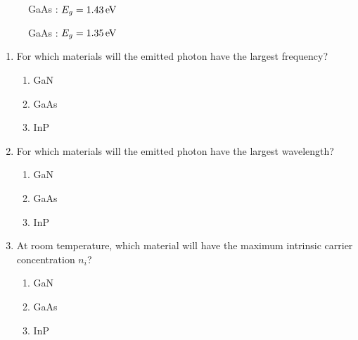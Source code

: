 \documentclass[fleqn, a4paper, 11pt, oneside]{amsart}
\theoremstyle{definition}
\theoremstyle{theorem}
\begin{document}
\begin{question}
\begin{figure}[H]
		\caption{GaAs : $E_g = 1.43 \electronvolt$}
	\end{figure}
	\begin{figure}[H]
		\centering
		\caption{GaAs : $E_g = 1.35 \electronvolt$}
	\end{figure}
	\begin{enumerate}[leftmargin=*]
		\item For which materials will the emitted photon have the largest frequency?
			\begin{enumerate}
				\item GaN
				\item GaAs
				\item InP
			\end{enumerate}
		\item For which materials will the emitted photon have the largest wavelength?
			\begin{enumerate}
				\item GaN
				\item GaAs
				\item InP
			\end{enumerate}
		\item At room temperature, which material will have the maximum intrinsic carrier concentration $n_i$?
			\begin{enumerate}
				\item GaN
				\item GaAs
				\item InP
			\end{enumerate}
	\end{enumerate}
\end{question}
\end{document}
